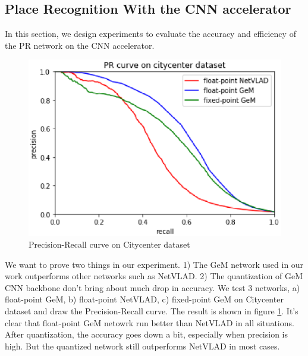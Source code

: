 


\subsection{ Place Recognition With the CNN accelerator }

In this section, we design experiments to evaluate the accuracy and efficiency of the PR network on the CNN accelerator. 

\begin{figure}[t]
    \centering
    \includegraphics[width=0.8\linewidth]{fig/result.eps}
    \caption{Precision-Recall curve on Citycenter dataset}
    \label{fig:PRcurve}
\end{figure}

We want to prove two things in our experiment. 1) The GeM network used in our work outperforms other networks such as NetVLAD. 2) The quantization of GeM CNN backbone don't bring about much drop in accuracy. We test 3 networks, a) float-point GeM, b) float-point NetVLAD, c) fixed-point GeM on Citycenter dataset and draw the Precision-Recall curve. The result is shown in figure \ref{fig:PRcurve}. It's clear that float-point GeM netowrk run better than NetVLAD in all situations. After quantization, the accuracy goes down a bit, especially when precision is high. But the quantized network still outperforms NetVLAD in most cases.



